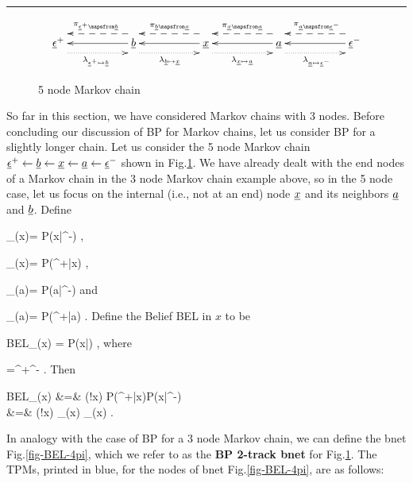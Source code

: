 \hrule

\begin{figure}[h!]
$$\xymatrix{
\rveps^+
\ar@{<--}@<2ex>[rr]^{\pi_{\rveps^+\ldart\rvb}}
\ar@{.>}@<-2ex>[rr]_{\lam_{\rveps^+\rdart\rvb}}
&&
\rvb\ar[ll]
\ar@{<--}@<2ex>[rr]^{\pi_{\rvb\ldart\rvx}}
\ar@{.>}@<-2ex>[rr]_{\lam_{\rvb\rdart\rvx}}
&&
\rvx\ar[ll]
\ar@{<--}@<2ex>[rr]^{\pi_{\rvx\ldart\rva}}
\ar@{.>}@<-2ex>[rr]_{\lam_{\rvx\rdart\rva}}
&&
\rva\ar[ll]
\ar@{<--}@<2ex>[rr]^{\pi_{\rva\ldart\rveps^-}}
\ar@{.>}@<-2ex>[rr]_{\lam_{\rva\rdart\rveps^-}}
&&
\rveps^-\ar[ll]
}$$
\caption{5 node Markov chain}
\label{fig-mp-5chain}
\end{figure}

So far in 
this section, we have considered Markov
chains with 3 nodes.
Before 
concluding our
discussion of BP for Markov chains,
let us consider BP
for a slightly longer chain.
Let us consider
the 5 node Markov
chain
$\underline{\epsilon}^+\leftarrow{\underline{b}}\leftarrow{\underline{x}}\leftarrow{\underline{a}}\leftarrow\underline{\epsilon}^-$
shown in Fig.\ref{fig-mp-5chain}.
We have already dealt 
with the end nodes
of a Markov chain in the 
3 node Markov chain
example above,
so in the 
5 node case, let us
focus on the internal (i.e., not at
an end) node ${\underline{x}}$ and its neighbors
${\underline{a}}$ and ${\underline{b}}$. Define



\beq
\pi_{\rvb\ldart \rvx}(x)=
P(x|\eps^-)
\;,
\eeq

\beq 
\lam_{\rvb\rdart \rvx}(x)=
P(\eps^+|x)
\;,
\eeq

\beq
\pi_{\rvx\ldart \rva}(a)=
P(a|\eps^-)
\;
\eeq
and

\beq 
\lam_{\rvx\rdart \rva}(a)=
P(\eps^+|a)
\;.
\eeq
Define the Belief BEL in $x$ to be

\beq
BEL_\rvx(x)
=
P(x|\eps)
\;,
\eeq
where

\beq
\rveps=\rveps^+\cup\rveps^-
\;.
\eeq
Then


\beqa
BEL_\rvx(x)
&=&
\caln(!x)
P(\eps^+|x)P(x|\eps^-)
\\
&=&
\caln(!x)
\lam_{\rvb\rdart \rvx}(x)
\pi_{\rvb\ldart \rvx}(x)
\;.
\eeqa

In analogy
with the case of BP for a 3 node Markov
chain, we can define the bnet
Fig.\ref{fig-BEL-4pi},
which we refer to as the
{\bf BP
2-track bnet} for Fig.\ref{fig-mp-5chain}.
The TPMs, printed in blue,
 for the 
nodes of bnet Fig.\ref{fig-BEL-4pi}, are
as follows:





